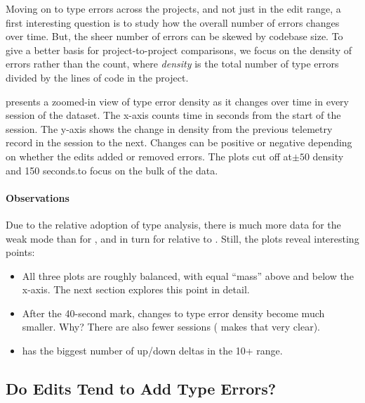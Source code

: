 \documentclass[english,submission,cleveref]{programming}
\begin{document}
Moving on to type errors across the projects, and not just in the edit range,
a first interesting question is to study how the overall number of errors
changes over time.
But, the sheer number of errors can be skewed by codebase size.
To give a better basis for project-to-project comparisons, we focus
on the density of errors rather than the count, where \emph{density} is
the total number of type errors divided by the lines of code in the project.

 presents a zoomed-in view of type error density as it
changes over time in every session of the dataset.
The x-axis counts time in seconds from the start of the session.
The y-axis shows the change in density from the previous telemetry record
in the session to the next.
Changes can be positive or negative depending on whether the edits added
or removed errors.
The plots cut off at$\pm{}50$ density and 150 seconds.to focus on the
bulk of the data.


\paragraph{Observations}

Due to the relative adoption of type analysis, there is much more
data for the weak \mnocheck{} mode than for \mnonstrict{},
and in turn for \mnonstrict{} relative to \mstrict{}.
Still, the plots reveal interesting points:

\begin{itemize}
  \item
    All three plots are roughly balanced,
    with equal ``mass'' above and below the x-axis.
    The next section explores this point in detail.

  \item
    After the 40-second mark, changes to type error density become much
    smaller.
    Why?
    There are also fewer sessions (\mstrict{} makes that very clear).

  \item
    \mnonstrict{} has the biggest number of up/down deltas in the 10+ range.
\end{itemize}


\subsection{Do Edits Tend to Add Type Errors?}
\end{document}
